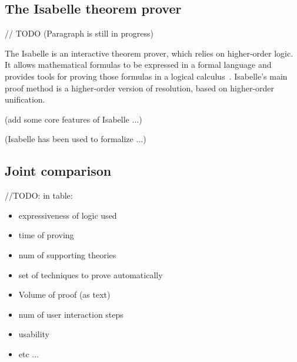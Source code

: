 \documentclass[article]{aaltoseries}
\begin{document}
\subsection{The Isabelle theorem prover}
\label{sec:prover_isabelle}

// TODO (Paragraph is still in progress)

The Isabelle is an interactive theorem prover, which relies on higher-order logic. It allows mathematical formulas to be expressed in a formal language and provides tools for proving those formulas in a logical calculus~\cite{tool_Isabelle}. Isabelle's main proof method is a higher-order version of resolution, based on higher-order unification.

(add some core features of Isabelle ...)

(Isabelle has been used to formalize ...)



\subsection{Joint comparison}
\label{sec:joint_comparison}

//TODO: in table:
\begin{itemize}
	\itemsep0em
	\item expressiveness of logic used
	\item time of proving
	\item num of supporting theories
	\item set of techniques to prove automatically
	\item Volume of proof (as text)
	\item num of user interaction steps
	\item usability
	\item etc ...
\end{itemize}
\end{document}
